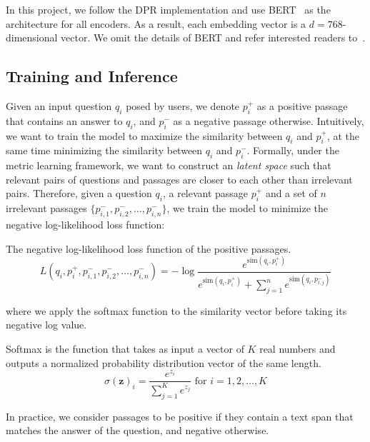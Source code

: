 %
In this project, we follow the DPR implementation and use BERT~\cite{devlin2019bert} as the architecture for all encoders.
%
As a result, each embedding vector is a $d=768$-dimensional vector.
%
We omit the details of BERT and refer interested readers to~\cite{devlin2019bert}.

%
\subsection{Training and Inference}
\label{sec:dpr_training}
%
Given an input question $q_i$ posed by users, we denote $p^{+}_i$ as a positive passage that contains an answer to $q_i$, and $p^{-}_i$ as a negative passage otherwise.
%
Intuitively, we want to train the model to maximize the similarity between $q_i$ and $p^{+}_i$, at the same time minimizing the similarity between $q_i$ and $p^{-}_i$.
%
Formally, under the metric learning framework, we want to construct an \emph{latent space} such that relevant pairs of questions and passages are closer to each other than irrelevant pairs.
%
Therefore, given a question $q_i$, a relevant passage $p^{+}_i$ and a set of $n$ irrelevant passages $\{p^{-}_{i, 1}, p^{-}_{i, 2}, \ldots, p^{-}_{i, n}\}$, we train the model to minimize the negative log-likelihood loss function:
%
\begin{definition}
	\label{def:nll}
	The negative log-likelihood loss function of the positive passages.
	\begin{equation}
	L(q_i, p^{+}_i, p^{-}_{i, 1}, p^{-}_{i, 2}, \ldots, p^{-}_{i, n}) = - \log \frac{e^{\text{sim}(q_i, p^{+}_i)}}{e^{\text{sim}(q_i, p^{+}_i)} + \sum_{j = 1}^{n} e^{\text{sim}(q_i, p^{-}_{i, j})}}
	\end{equation}
\end{definition}
%
where we apply the softmax function to the similarity vector before taking its negative log value.
\begin{definition}[Softmax]
	\label{def:softmax}
	Softmax is the function that takes as input a vector of $K$ real numbers and outputs a normalized probability distribution vector of the same length.
	\begin{equation}
	\sigma(\mathbf{z})_i = \frac{e^{z_i}}{\sum_{j = 1}^{K}e^{z_j}} \text{ for } i = 1, 2, \ldots, K
	\end{equation}
\end{definition}
%
In practice, we consider passages to be positive if they contain a text span that matches the answer of the question, and negative otherwise.

